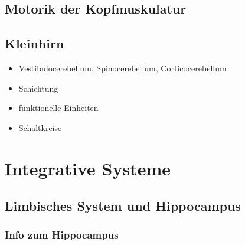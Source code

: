 \documentclass[12pt,a4paper,pdftex]{article}
\begin{document}
\subsection{Motorik der Kopfmuskulatur}



\subsection{Kleinhirn}
\begin{itemize}
    \item Vestibulocerebellum, Spinocerebellum, Corticocerebellum 
    \item Schichtung
    \item funktionelle Einheiten
    \item Schaltkreise
\end{itemize}


\newpage
\section{Integrative Systeme} \label{sec:integrative_systeme}
\subsection{Limbisches System und Hippocampus}

\subsubsection*{Info zum Hippocampus}
\end{document}
